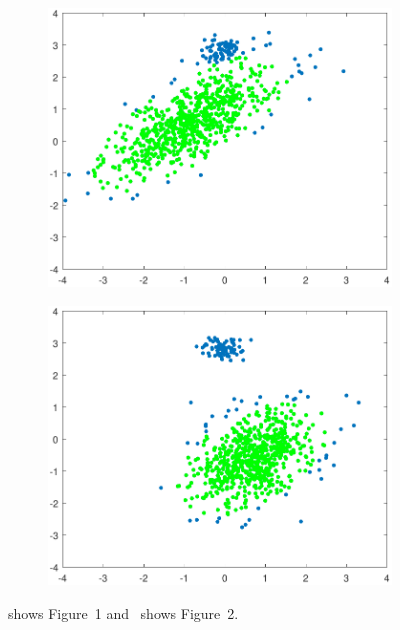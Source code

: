 \documentclass[preprint,12pt]{elsarticle}
\begin{document}
\begin{figure}[ht!]
	\begin{subfigure}[b]{0.45\linewidth}
		\centering\includegraphics[width=1\linewidth]{figures/kcstep/c1output.pdf}
		\caption{\label{fig:kcstepc1}}
	\end{subfigure}
	\begin{subfigure}[b]{0.45\linewidth}
		\centering\includegraphics[width=1\linewidth]{figures/kcstep/c2output.pdf}
		\caption{\label{fig:kcstepc2}}
	\end{subfigure}

	\caption{ shows Figure~1 and~ shows Figure~2.}
\end{figure}
\end{document}
